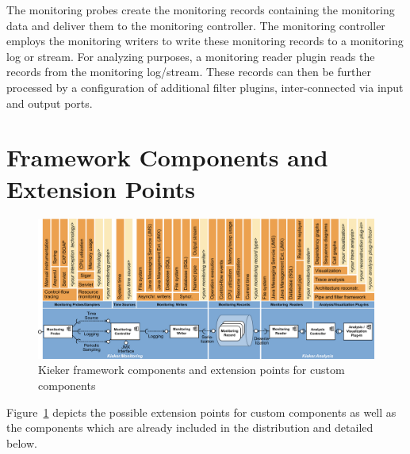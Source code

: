 
\noindent The monitoring probes create the monitoring records containing the %
monitoring data and deliver them to the monitoring controller. %
The monitoring controller employs the monitoring writers to write these %
monitoring records to a monitoring log or stream. %
For analyzing purposes, a monitoring reader plugin reads the records from the %
monitoring log/stream. These records can then be further processed by a %
configuration of additional filter plugins, inter-connected via input and output ports. %

\section{Framework Components and Extension Points}

\begin{figure}\centering
\includegraphics[width=\textwidth]{images/framework-figure}
\caption{Kieker framework components and extension points for custom components}
\label{fig:frameworkComponentsExtensionPoints}
\end{figure}

Figure~\ref{fig:frameworkComponentsExtensionPoints} depicts the possible %
extension points for custom components as well as the components which %
are already included in the \Kieker{} distribution and detailed below. %

\medskip

